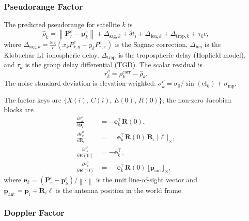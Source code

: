 \documentclass[journal]{IEEEtran}
\newcommand{\norm}[1]{\left\|#1\right\|}
\newcommand{\E}{\mathbf{E}}           %
\newcommand{\Rext}{\mathbf{R}}        %
\newcommand{\pe}{\mathbf{p}}
\begin{document}
\subsubsection{Pseudorange Factor}

The predicted pseudorange for satellite $k$ is
\begin{equation}
  \hat{\rho}_k = \norm{\mathbf{P}_r^e - \mathbf{p}_k^e}
               + \Delta_{\mathrm{sag},k}
               + \delta t_i
               + \Delta_{\mathrm{ion},k}
               + \Delta_{\mathrm{trop},k}
               + \tau_k c,
  \label{eq:pr_pred}
\end{equation}
where $\Delta_{\mathrm{sag},k} = \frac{\omega_E}{c}(x_k P_{r,y}^e - y_k P_{r,x}^e)$
is the Sagnac correction, $\Delta_{\mathrm{ion}}$ is the Klobuchar L1
ionospheric delay, $\Delta_{\mathrm{trop}}$ is the tropospheric delay
(Hopfield model), and $\tau_k$ is the group delay differential (TGD).
The scalar residual is
\begin{equation}
  r_k^\rho = \rho_k^{\mathrm{corr}} - \hat{\rho}_k.
  \label{eq:pr_residual}
\end{equation}
The noise standard deviation is elevation-weighted:
$\sigma_k^\rho = \sigma_0 / \sin(\mathrm{el}_k) + \sigma_{\mathrm{mp}}$.

The factor keys are $\{X(i),\,C(i),\,E(0),\,R(0)\}$; the non-zero
Jacobian blocks are
\begin{align}
  \frac{\partial r_k^\rho}{\partial \pe_i}
    &= -\mathbf{e}_k^\top \Rext(0), \label{eq:J_pos}\\
  \frac{\partial r_k^\rho}{\partial \mathbf{R}_i}
    &= \phantom{-}\mathbf{e}_k^\top \Rext(0)\,\mathbf{R}_i\,\lfloor\bm{\ell}\rfloor_\times,
    \label{eq:J_rot}\\
  \frac{\partial r_k^\rho}{\partial \E(0)}
    &= -\mathbf{e}_k^\top, \label{eq:J_E0}\\
  \frac{\partial r_k^\rho}{\partial \Rext(0)}
    &= \phantom{-}\mathbf{e}_k^\top \Rext(0)\,\lfloor\mathbf{p}_{\mathrm{ant}}\rfloor_\times,
    \label{eq:J_R0}
\end{align}
where $\mathbf{e}_k = (\mathbf{P}_r^e - \mathbf{p}_k^e)/\norm{\cdot}$
is the unit line-of-sight vector and
$\mathbf{p}_{\mathrm{ant}} = \pe_i + \mathbf{R}_i\bm{\ell}$ is the antenna
position in the world frame.

\subsubsection{Doppler Factor}
\end{document}
